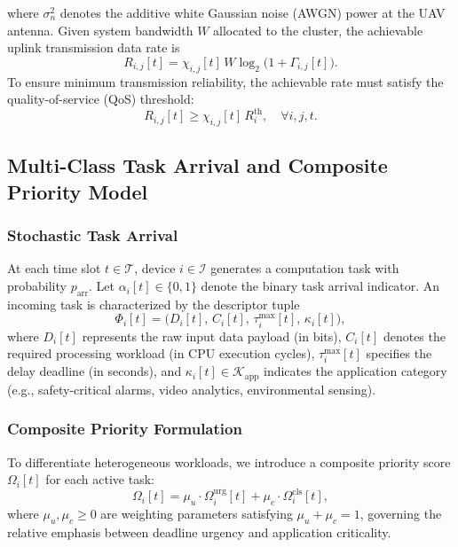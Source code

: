 \documentclass[journal]{IEEEtran}
\begin{document}
where $\sigma_n^2$ denotes the additive white Gaussian noise (AWGN) power at the UAV antenna. Given system bandwidth $W$ allocated to the cluster, the achievable uplink transmission data rate is
\begin{equation}
    R_{i,j}[t] = \chi_{i,j}[t] \, W \log_2\!\bigl(1 + \Gamma_{i,j}[t]\bigr).
    \label{eq:rate_noma}
\end{equation}
To ensure minimum transmission reliability, the achievable rate must satisfy the quality-of-service (QoS) threshold:
\begin{equation}
    R_{i,j}[t] \ge \chi_{i,j}[t] \, R_i^{\mathrm{th}}, \quad \forall i, j, t.
    \label{eq:qos_constraint}
\end{equation}

\subsection{Multi-Class Task Arrival and Composite Priority Model}
\label{sec:task_priority}

\subsubsection{Stochastic Task Arrival}
At each time slot $t \in \mathcal{T}$, device $i \in \mathcal{I}$ generates a computation task with probability $p_{\mathrm{arr}}$. Let $\alpha_i[t] \in \{0, 1\}$ denote the binary task arrival indicator. An incoming task is characterized by the descriptor tuple
\begin{equation}
    \Phi_i[t] = \bigl(D_i[t], \, C_i[t], \, \tau_i^{\max}[t], \, \kappa_i[t]\bigr),
    \label{eq:task_tuple}
\end{equation}
where $D_i[t]$ represents the raw input data payload (in bits), $C_i[t]$ denotes the required processing workload (in CPU execution cycles), $\tau_i^{\max}[t]$ specifies the delay deadline (in seconds), and $\kappa_i[t] \in \mathcal{K}_{\mathrm{app}}$ indicates the application category (e.g., safety-critical alarms, video analytics, environmental sensing).

\subsubsection{Composite Priority Formulation}
To differentiate heterogeneous workloads, we introduce a composite priority score $\Omega_i[t]$ for each active task:
\begin{equation}
    \Omega_i[t] = \mu_u \cdot \Omega_i^{\mathrm{urg}}[t] + \mu_c \cdot \Omega_i^{\mathrm{cls}}[t],
    \label{eq:priority_weight}
\end{equation}
where $\mu_u, \mu_c \ge 0$ are weighting parameters satisfying $\mu_u + \mu_c = 1$, governing the relative emphasis between deadline urgency and application criticality.
\end{document}
